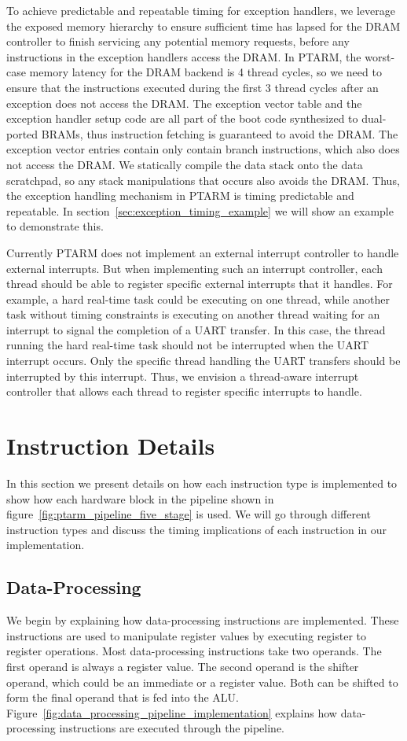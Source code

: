 To achieve predictable and repeatable timing for exception handlers, we leverage the exposed memory hierarchy to ensure sufficient time has lapsed for the DRAM controller to finish servicing any potential memory requests, before any instructions in the exception handlers access the DRAM.
In PTARM, the worst-case memory latency for the DRAM backend is 4 thread cycles, so we need to ensure that the instructions executed during the first 3 thread cycles after an exception does not access the DRAM.
The exception vector table and the exception handler setup code are all part of the boot code synthesized to dual-ported BRAMs, thus instruction fetching is guaranteed to avoid the DRAM.
The exception vector entries contain only contain branch instructions, which also does not access the DRAM.
We statically compile the data stack onto the data scratchpad, so any stack manipulations that occurs also avoids the DRAM.
Thus, the exception handling mechanism in PTARM is timing predictable and repeatable. 
In section~\ref{sec:exception_timing_example} we will show an example to demonstrate this.  

Currently PTARM does not implement an external interrupt controller to handle external interrupts. 
But when implementing such an interrupt controller, each thread should be able to register specific external interrupts that it handles.
For example, a hard real-time task could be executing on one thread, while another task without timing constraints is executing on another thread waiting for an interrupt to signal the completion of a UART transfer.
In this case, the thread running the hard real-time task should not be interrupted when the UART interrupt occurs.
Only the specific thread handling the UART transfers should be interrupted by this interrupt.  
Thus, we envision a thread-aware interrupt controller that allows each thread to register specific interrupts to handle.

\section{Instruction Details}
\label{sec:ptarm_instructions}
In this section we present details on how each instruction type is implemented to show how each hardware block in the pipeline shown in figure~\ref{fig:ptarm_pipeline_five_stage} is used.
We will go through different instruction types and discuss the timing implications of each instruction in our implementation.
   
\subsection{Data-Processing}
We begin by explaining how data-processing instructions are implemented.
These instructions are used to manipulate register values by executing register to register operations. 
Most data-processing instructions take two operands.
The first operand is always a register value.
The second operand is the shifter operand, which could be an immediate or a register value.
Both can be shifted to form the final operand that is fed into the ALU.
Figure~\ref{fig:data_processing_pipeline_implementation} explains how data-processing instructions are executed through the pipeline.

